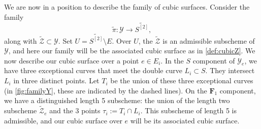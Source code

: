 \documentclass[12pt,reqno]{amsart}
\renewcommand{\to}{{\longrightarrow}}
\numberwithin{equation}{section}
\newcommand{\F}{\mathbf F}
\begin{document}
We are now in a position to describe the family of cubic surfaces.
Consider the family
\[ \widetilde \pi \colon \mathcal Y \to \widetilde{S^{[2]}},\]
along with $\widetilde {\mathcal Z} \subset \mathcal Y$.
Set $U = \widetilde{S^{[2]}} \setminus E$.
Over $U$, the $\widetilde{\mathcal Z}$ is an admissible subscheme of $\mathcal Y$, and here our family will be the associated cubic surface as in \autoref{def:cubicZ}.
We now describe our cubic surface over a point $e \in E_i$.
In the $S$ component of $\mathcal Y_e$, we have three exceptional curves that meet the double curve $L_i \subset S$.
They intersect $L_i$ in three distinct points.
Let $T_i$ be the union of these three exceptional curves (in \autoref{fig:familyY}, these are indicated by the dashed lines).
On the $\F_1$ component, we have a distinguished length 5 subscheme: the union of the length two subscheme $\widetilde{\mathcal Z}_e$ and the 3 points $\tau_i := T_i \cap L_i$.
This subscheme of length 5 is admissible, and our cubic surface over $e$ will be its associated cubic surface.
\end{document}
